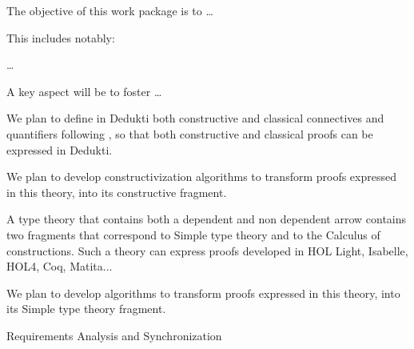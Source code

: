 \begin{workpackage}[id=instrumentation,wphases=0-48,
  short=Instrument Provers,%
  title=Instrument proof systems to produce Dedukti proof,
  lead=ULe,
  ULeRM=10]
  

\begin{wpobjectives}
  The objective of this work package is to \ldots

This includes notably:
  \begin{compactitem}
  \item \ldots
  \end{compactitem}
  A key aspect will be to foster \ldots
\end{wpobjectives}


\begin{wpdescription}
\end{wpdescription}

\begin{tasklist}
\begin{task}[id=ecumenical,title=Ecumenical Dedukti]

We plan to define in {\sc Dedukti} both constructive and classical
connectives and quantifiers
following \cite{PrawitzPereira,DowekPereira,Pereira}, so that both
constructive and classical proofs can be expressed in {\sc Dedukti}.

We plan to develop constructivization algorithms to transform proofs
expressed in this theory, into its constructive fragment.
\end{task}

\begin{task}[id=unitt,title=A universal type theory]
A type theory that contains both a dependent and non dependent arrow
contains two fragments that correspond to Simple type theory and to
the Calculus of constructions. Such a theory can express proofs
developed in HOL Light, Isabelle, HOL4, Coq, Matita...

We plan to develop algorithms to transform proofs expressed in this
theory, into its Simple type theory fragment.
\end{task}
\end{tasklist}

\begin{wpdelivs}
  \begin{wpdeliv}[due=3,miles=startup,id=requirements,dissem=PU,nature=DEM,lead=ISa]
      {Requirements Analysis and Synchronization}
\end{wpdeliv}
\end{wpdelivs}
\end{workpackage}

